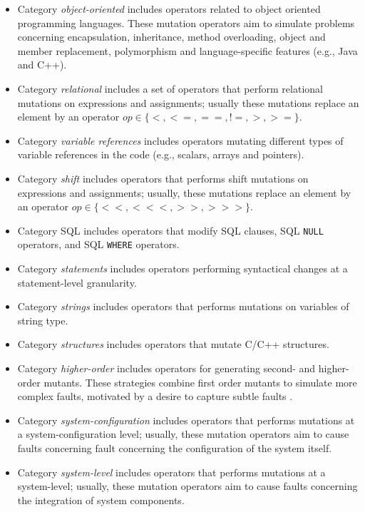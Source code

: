 \begin{itemize}
\item Category \emph{object-oriented} includes operators related to object oriented programming languages. These mutation operators aim to simulate problems concerning encapsulation, inheritance, method overloading, object and member replacement, polymorphism and language-specific features (e.g., Java and C++).
\item Category \emph{relational} includes a set of operators that perform relational mutations on expressions and assignments; usually these mutations replace an element by an operator $op \in \{<, <=, ==, !=, >, >=\}$.
\item Category \emph{variable references} includes operators mutating different types of variable references in the code (e.g., scalars, arrays and pointers).
\item Category \emph{shift} includes operators that performs shift mutations on expressions and assignments; usually, these mutations replace an element by an operator $op \in \{<<, <<<, >>, >>>\}$.
\item Category SQL includes operators that modify SQL clauses, SQL \texttt{NULL} operators, and SQL \texttt{WHERE} operators.
\item Category \emph{statements} includes operators performing syntactical changes at a statement-level granularity.
\item Category \emph{strings} includes operators that performs mutations on variables of string type.
\item Category \emph{structures} includes operators that mutate C/C++ structures.
\item Category \emph{higher-order} includes operators for generating second- and higher-order mutants. These strategies combine first order mutants to simulate more complex faults, motivated by a desire to capture subtle faults \cite{jia2009higher}.  
\item Category \emph{system-configuration} includes operators that performs mutations at a system-configuration level; usually, these mutation operators aim to cause faults concerning fault concerning the configuration of the system itself.
\item Category \emph{system-level} includes operators that performs mutations at a system-level; usually, these mutation operators aim to cause faults concerning the integration of system components. 

\end{itemize}
